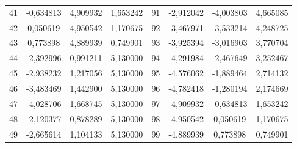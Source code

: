 \begin{apendicesenv}
\begin{table}[H]
\begin{tabular}{c c c c c c c c}
41 & -0,634813 & 4,909932 & 1,653242 & 91 & -2,912042 & -4,003803 & 4,665085 \\
42 & 0,050619 & 4,950542 & 1,170675 & 92 & -3,467971 & -3,533214 & 4,248725 \\
43 & 0,773898 & 4,889939 & 0,749901 & 93 & -3,925394 & -3,016903 & 3,770704 \\
44 & -2,392996 & 0,991211 & 5,130000 & 94 & -4,291984 & -2,467649 & 3,252467 \\
45 & -2,938232 & 1,217056 & 5,130000 & 95 & -4,576062 & -1,889464 & 2,714132 \\
46 & -3,483469 & 1,442900 & 5,130000 & 96 & -4,782418 & -1,280194 & 2,174669 \\
47 & -4,028706 & 1,668745 & 5,130000 & 97 & -4,909932 & -0,634813 & 1,653242 \\
48 & -2,120377 & 0,878289 & 5,130000 & 98 & -4,950542 & 0,050619 & 1,170675 \\
49 & -2,665614 & 1,104133 & 5,130000 & 99 & -4,889939 & 0,773898 & 0,749901 \\
		\bottomrule
	\end{tabular}
	\label{tab:apendiceA_coordenadas}
\end{table}


\end{apendicesenv}
